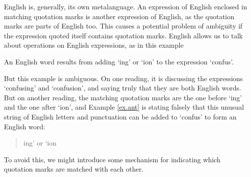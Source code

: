 English is, generally, its own metalanguage. An expression of English enclosed in matching quotation marks is another expression of English, as the quotation marks are parts of English too. This causes a potential problem of ambiguity if the expression quoted itself contains quotation marks.  English allows us to talk about operations on English expressions, as in this example \begin{earg}
	\item [\ex{ex.ant}] An English word results from adding `ing' or `ion' to the expression `confus'.
\end{earg} But this example is ambiguous. On one reading, it is discussing the expressions `confusing' and `confusion', and saying truly that they are both English words. But on another reading, the matching quotation marks are the one before `ing' and the one after `ion', and Example \ref{ex.ant} is stating falsely that this unusual string of English letters and punctuation can be added to `confus' to form an English word: \begin{quote}
ing’ or ‘ion
\end{quote} To avoid this, we might introduce some mechanism for indicating which quotation marks are matched with each other.





